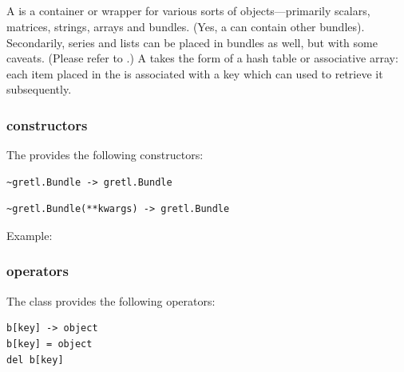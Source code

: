 \subsection[gretl.Bundle class]{\classpybundle}\label{sec:classpybundle}
A  is a container or wrapper for various
sorts of objects---primarily scalars, matrices, strings, arrays
and bundles. (Yes, a  can contain other bundles).\newline
Secondarily, series and lists can be placed in bundles as well,
but with some caveats. (Please refer to \cite{gretl_manual}.)
A  takes the form of a hash table or associative
array: each item placed in the  is associated
with a key which can used to retrieve it subsequently.


\subsubsection{\classpybundleb constructors}
The \classpybundle provides the following constructors:

\begin{lstlisting}[style=pythonstylefoot]
~gretl.Bundle -> gretl.Bundle
\end{lstlisting}

\begin{lstlisting}[style=pythonstylefoot]
~gretl.Bundle(**kwargs) -> gretl.Bundle
\end{lstlisting}
Example:\newline
{}


\subsubsection{\classpybundleb operators}
The \classpybundle class provides the following operators:

\gretlfpycmd{[]}
\begin{lstlisting}[style=pythonstylefoot]
b[key] -> object
b[key] = object
del b[key]
\end{lstlisting}


